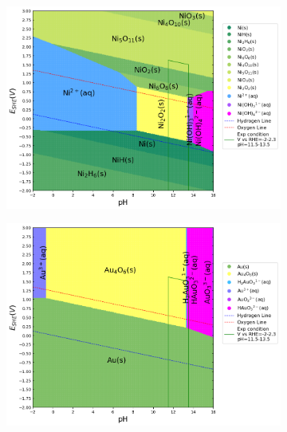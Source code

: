 \documentclass[journal=jacsat,manuscript=article]{achemso}
\begin{document}
\begin{figure}[htbp]
    \centering
    \begin{subfigure}[b]{0.3\textwidth}
        \subcaption{}\label{fig:Ni_Pourbaix_H2O}
        \includegraphics[width=\textwidth]{Figures/pourbaix_diagrams/Ni-NH3-H2O_activity=1e-04_[NH3]=0M_[Gly]=0M_[CN]=0.png}
        \par\medskip
    \end{subfigure}
    \begin{subfigure}[b]{0.3\textwidth}
        \subcaption{}\label{fig:Au_Pourbaix_H2O}
        \includegraphics[width=\textwidth]{Figures/pourbaix_diagrams/Au-NH3-H2O_activity=1e-04_[NH3]=0M_[Gly]=0M_[CN]=0.png}
        \par\medskip

\end{subfigure}
\end{figure}
\end{document}
